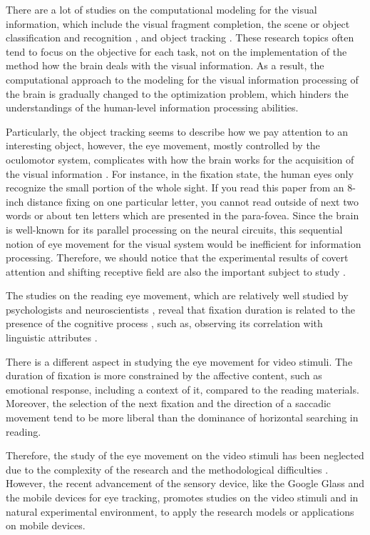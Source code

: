 \documentclass[oneside,master]{snueethesis}
\begin{document}
There are a lot of studies on the computational modeling for the visual information, which include the visual fragment completion, the scene or object classification and recognition \cite{winn2005,lazebnik2006}, and object tracking \cite{YiWu2013}. These research topics often tend to focus on the objective for each task, not on the implementation of the method how the brain deals with the visual information. As a result, the computational approach to the modeling for the visual information processing of the brain is gradually changed to the optimization problem, which hinders the understandings of the human-level information processing abilities. 

Particularly, the object tracking seems to describe how we pay attention to an interesting object, however, the eye movement, mostly controlled by the oculomotor system, complicates with how the brain works for the acquisition of the visual information \cite{Henderson2003}. For instance, in the fixation state, the human eyes only recognize the small portion of the whole sight. If you read this paper from an 8-inch distance fixing on one particular letter, you cannot read outside of next two words or about ten letters which are presented in the para-fovea. Since the brain is well-known for its parallel processing on the neural circuits, this sequential notion of eye movement for the visual system would be inefficient for information processing. Therefore, we should notice that the experimental results of covert attention and shifting receptive field are also the important subject to study \cite{Zirnsak2014}.

The studies on the reading eye movement, which are relatively well studied by psychologists and neuroscientists \cite{Rayner1998,Reichle1998}, reveal that fixation duration is related to the presence of the cognitive process \cite{Rayner1997}, such as, observing its correlation with linguistic attributes \cite{Inhoff1986,Rayner1986}.

There is a different aspect in studying the eye movement for video stimuli. The duration of fixation is more constrained by the affective content, such as emotional response, including a context of it, compared to the reading materials. Moreover, the selection of the next fixation and the direction of a saccadic movement tend to be more liberal than the dominance of horizontal searching in reading. 

Therefore, the study of the eye movement on the video stimuli has been neglected due to the complexity of the research and the methodological difficulties \cite{Tatler2011}. However, the recent advancement of the sensory device, like the Google Glass and the mobile devices for eye tracking, promotes studies on the video stimuli and in natural experimental environment, to apply the research models or applications on mobile devices. 
\end{document}
